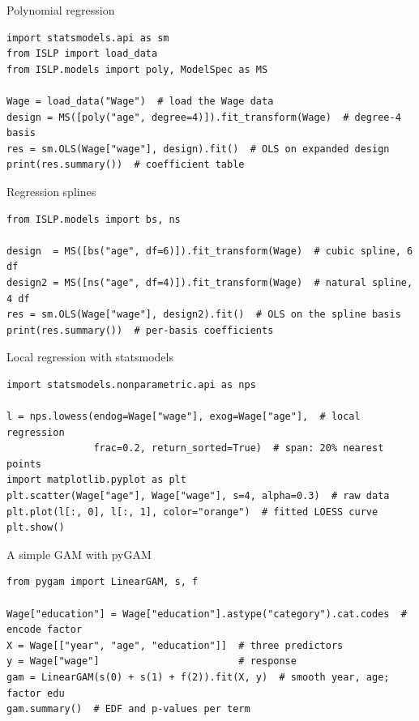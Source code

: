 \documentclass[aspectratio=169,11pt]{beamer}
\begin{document}

\begin{frame}[fragile]{Polynomial regression}
  \begin{lstlisting}
import statsmodels.api as sm
from ISLP import load_data
from ISLP.models import poly, ModelSpec as MS

Wage = load_data("Wage")  # load the Wage data
design = MS([poly("age", degree=4)]).fit_transform(Wage)  # degree-4 basis
res = sm.OLS(Wage["wage"], design).fit()  # OLS on expanded design
print(res.summary())  # coefficient table
  \end{lstlisting}
\end{frame}

\begin{frame}[fragile]{Regression splines}
  \begin{lstlisting}
from ISLP.models import bs, ns

design  = MS([bs("age", df=6)]).fit_transform(Wage)  # cubic spline, 6 df
design2 = MS([ns("age", df=4)]).fit_transform(Wage)  # natural spline, 4 df
res = sm.OLS(Wage["wage"], design2).fit()  # OLS on the spline basis
print(res.summary())  # per-basis coefficients
  \end{lstlisting}
\end{frame}

\begin{frame}[fragile]{Local regression with statsmodels}
  \begin{lstlisting}
import statsmodels.nonparametric.api as nps

l = nps.lowess(endog=Wage["wage"], exog=Wage["age"],  # local regression
               frac=0.2, return_sorted=True)  # span: 20% nearest points
import matplotlib.pyplot as plt
plt.scatter(Wage["age"], Wage["wage"], s=4, alpha=0.3)  # raw data
plt.plot(l[:, 0], l[:, 1], color="orange")  # fitted LOESS curve
plt.show()
  \end{lstlisting}
\end{frame}

\begin{frame}[fragile]{A simple GAM with pyGAM}
  \begin{lstlisting}
from pygam import LinearGAM, s, f

Wage["education"] = Wage["education"].astype("category").cat.codes  # encode factor
X = Wage[["year", "age", "education"]]  # three predictors
y = Wage["wage"]                        # response
gam = LinearGAM(s(0) + s(1) + f(2)).fit(X, y)  # smooth year, age; factor edu
gam.summary()  # EDF and p-values per term
  \end{lstlisting}
\end{frame}
\end{document}
